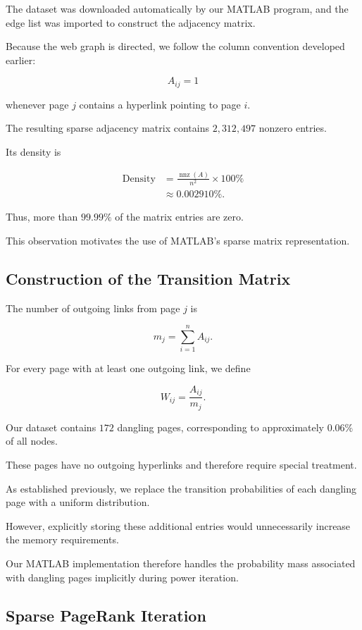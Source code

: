 \documentclass[11pt,a4paper]{article}
\theoremstyle{definition}
\theoremstyle{remark}
\begin{document}
The dataset was downloaded
automatically by our MATLAB program,
and the edge list was imported
to construct the adjacency matrix.

Because the web graph is directed,
we follow the column convention
developed earlier:

\[
A_{ij}=1
\]

whenever page $j$ contains
a hyperlink pointing to page $i$.

The resulting sparse adjacency
matrix contains $2{,}312{,}497$
nonzero entries.

Its density is

\[
\begin{aligned}
\text{Density}
&=
\frac{\operatorname{nnz}(A)}{n^2}
\times100\%\\
&\approx0.002910\%.
\end{aligned}
\]

Thus, more than $99.99\%$
of the matrix entries are zero.

This observation motivates the use
of MATLAB's sparse matrix
representation.

\subsection{Construction of the
Transition Matrix}

The number of outgoing links
from page $j$ is

\[
m_j=\sum_{i=1}^{n}A_{ij}.
\]

For every page with at least
one outgoing link, we define

\[
W_{ij}=\frac{A_{ij}}{m_j}.
\]

Our dataset contains $172$
dangling pages, corresponding
to approximately $0.06\%$
of all nodes.

These pages have no outgoing
hyperlinks and therefore require
special treatment.

As established previously,
we replace the transition
probabilities of each dangling
page with a uniform distribution.

However, explicitly storing
these additional entries
would unnecessarily increase
the memory requirements.

Our MATLAB implementation
therefore handles the probability
mass associated with dangling
pages implicitly during
power iteration.

\subsection{Sparse PageRank Iteration}
\end{document}
